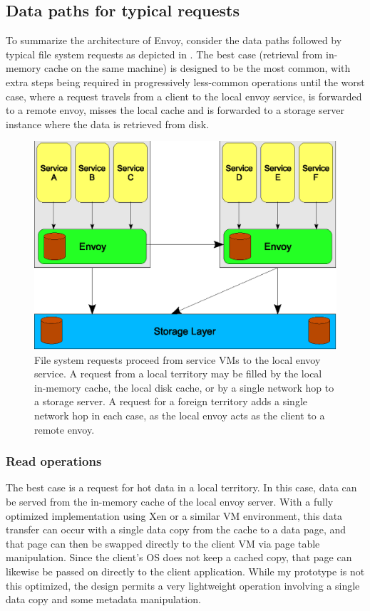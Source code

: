 \subsection{Data paths for typical requests}

To summarize the architecture of Envoy, consider the data paths followed by typical file system requests as depicted in . The best case (retrieval from in-memory cache on the same machine) is designed to be the most common, with extra steps being required in progressively less-common operations until the worst case, where a request travels from a client to the local envoy service, is forwarded to a remote envoy, misses the local cache and is forwarded to a storage server instance where the data is retrieved from disk.

\begin{figure}[tp]
\centering
\includegraphics{figures/hops}
\caption{File system requests proceed from service VMs to the local envoy service. A request from a local territory may be filled by the local in-memory cache, the local disk cache, or by a single network hop to a storage server. A request for a foreign territory adds a single network hop in each case, as the local envoy acts as the client to a remote envoy.}
\label{fig:hops}
\end{figure}

\subsubsection{Read operations}\label{sec:data-paths-read}

The best case is a request for hot data in a local territory. In this case, data can be served from the in-memory cache of the local envoy server. With a fully optimized implementation using Xen or a similar VM environment, this data transfer can occur with a single data copy from the cache to a data page, and that page can then be swapped directly to the client VM via page table manipulation. Since the client's OS does not keep a cached copy, that page can likewise be passed on directly to the client application. While my prototype is not this optimized, the design permits a very lightweight operation involving a single data copy and some metadata manipulation.

